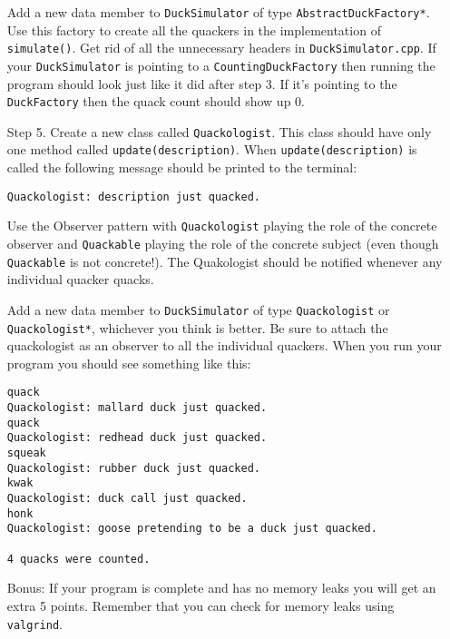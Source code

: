 \documentclass[11pt]{article}
\newlength{\up}\setlength{\up}{-\baselineskip}
\begin{document}
\begin{enumerate}
  Add a new data member to \texttt{DuckSimulator} of type \texttt{AbstractDuckFactory*}. Use this factory to create all the quackers in the implementation of \texttt{simulate()}. Get rid of all the unnecessary headers in \texttt{DuckSimulator.cpp}. If your \texttt{DuckSimulator} is pointing to a \texttt{CountingDuckFactory} then running the program should look just like it did after step 3. If it's pointing to the \texttt{DuckFactory} then the quack count should show up 0.

\newpage

  \item[Step 5.] Create a new class called \texttt{Quackologist}. This class should have only one method called \texttt{update(description)}. When \texttt{update(description)} is called the following message should be printed to the terminal: 
  \begin{center}\begin{verbatim}Quackologist: description just quacked.\end{verbatim}
  \end{center}
  Use the Observer pattern with \texttt{Quackologist} playing the role of the concrete observer and \texttt{Quackable} playing the role of the concrete subject (even though \texttt{Quackable} is not concrete!). The Quakologist should be notified whenever any individual quacker quacks. 

  Add a new data member to \texttt{DuckSimulator} of type \texttt{Quackologist} or \texttt{Quackologist*}, whichever you think is better. Be sure to attach the quackologist as an observer to all the individual quackers. When you run your program you should see something like this:
\begin{verbatim}
quack
Quackologist: mallard duck just quacked.
quack
Quackologist: redhead duck just quacked.
squeak
Quackologist: rubber duck just quacked.
kwak
Quackologist: duck call just quacked.
honk
Quackologist: goose pretending to be a duck just quacked.

4 quacks were counted.
\end{verbatim}




  \item[Bonus: ] If your program is complete and has no memory leaks you will get an extra 5 points. Remember that you can check for memory leaks using \texttt{valgrind}.


\end{enumerate}
\end{document}
